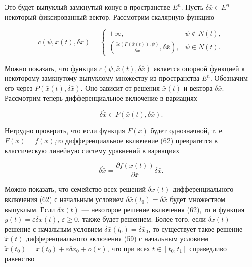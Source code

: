 \documentclass[10pt]{article}
\begin{document}
Это будет выпуклый замкнутый конус в пространстве \({E}^{n}\). Пусть \(\delta \bar{x} \in  {E}^{n}\) — некоторый фиксированный вектор. Рассмотрим скалярную функцию

\[
c\left( {\psi,\bar{x}\left( t\right),\delta \bar{x}}\right)  = \left\{  \begin{array}{cc} + \infty, & \psi  \notin  N\left( t\right), \\  \left( {\frac{\partial c\left( {F\left( {\bar{x}\left( t\right) }\right),\psi }\right) }{\partial \bar{x}},\delta \bar{x}}\right), & \psi  \in  N\left( t\right). \end{array}\right.
\]

Можно показать, что функция \(c\left( {\psi,\bar{x}\left( t\right),\delta \bar{x}}\right)\) является опорной функцией к некоторому замкнутому выпуклому множеству из пространства \({E}^{n}\). Обозначим его через \(P\left( {\bar{x}\left( t\right),\delta \bar{x}}\right)\). Оно зависит от решения \(\bar{x}\left( t\right)\) и вектора \(\delta \bar{x}\). Рассмотрим теперь дифференциальное включение в вариациях

\[
\delta \dot{\bar{x}} \in  P\left( {\bar{x}\left( t\right),\delta \bar{x}}\right). \tag{62}
\]

Нетрудно проверить, что если функция \(F\left( \bar{x}\right)\) будет однозначной, т. е. \(F\left( \bar{x}\right)  = f\left( \bar{x}\right)\),то дифференциальное включение (62) превратится в классическую линейную систему уравнений в вариациях

\[
\delta \dot{\bar{x}} = \frac{\partial f\left( {\bar{x}\left( t\right) }\right) }{\partial \bar{x}}\delta \bar{x}.
\]

Можно показать, что семейство всех решений \(\delta \bar{x}\left( t\right)\) дифференциального включения (62) с начальным условием \(\delta \bar{x}\left( {t}_{0}\right)  = \delta \bar{x}\) будет множеством выпуклым. Если \(\delta \bar{x}\left( t\right)\) — некоторое решение включения (62), то и функция \(\bar{y}\left( t\right)  = {\varepsilon \delta }\bar{x}\left( t\right)\), \(\varepsilon  \geq  0\), также будет решением. Более того, если \(\delta \bar{x}\left( t\right)\) — решение с начальным условием \(\delta \bar{x}\left( {t}_{0}\right)  = \delta {\bar{x}}_{0}\), то существует такое решение \(\widetilde{x}\left( t\right)\) дифференциального включения (59) с начальным условием \(\widetilde{x}\left( {t}_{0}\right)  = \bar{x}\left( {t}_{0}\right)  + {\varepsilon \delta \bar{x}}_{0} + o\left( \varepsilon \right)\), что при всех \(t \in \left\lbrack  {{t}_{0},{t}_{1}}\right\rbrack\) справедливо равенство
\end{document}
